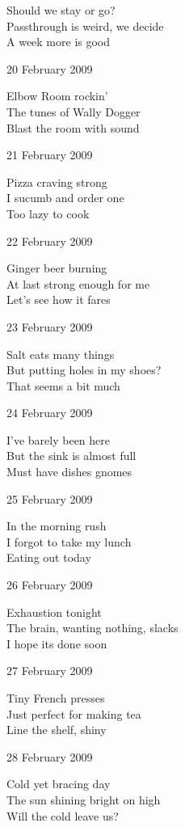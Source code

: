 \documentclass[12pt]{article}
\begin{document}
Should we stay or go? \\
Passthrough is weird, we decide \\
A week more is good

20 February 2009

Elbow Room rockin'  \\
The tunes of Wally Dogger \\
Blast the room with sound

21 February 2009

Pizza craving strong \\
I sucumb and order one \\
Too lazy to cook


\newpage

22 February 2009

Ginger beer burning \\
At last strong enough for me \\
Let's see how it fares

23 February 2009

Salt eats many things \\
But putting holes in my shoes? \\
That seems a bit much

24 February 2009

I've barely been here \\
But the sink is almost full \\
Must have dishes gnomes

25 February 2009

In the morning rush \\
I forgot to take my lunch \\
Eating out today

26 February 2009

Exhaustion tonight \\
The brain, wanting nothing, slacks \\
I hope its done soon

27 February 2009

Tiny French presses \\
Just perfect for making tea \\
Line the shelf, shiny

28 February 2009

Cold yet bracing day \\
The sun shining bright on high \\
Will the cold leave us?


\newpage
\end{document}
